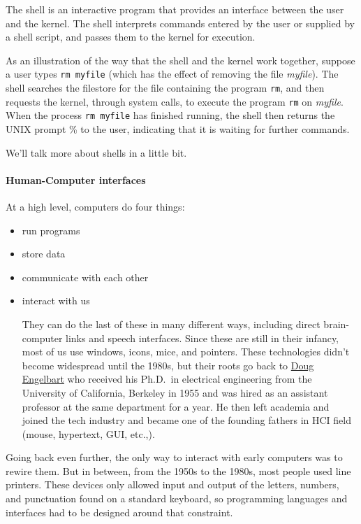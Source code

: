 \documentclass[
]{book}
\begin{document}
The shell is an interactive program that provides an interface between the user and the kernel. The shell interprets commands entered by the user or supplied by a shell script, and passes them to the kernel for execution.

As an illustration of the way that the shell and the kernel work together, suppose a user types \texttt{rm\ myfile} (which has the effect of removing the file \emph{myfile}). The shell searches the filestore for the file containing the program \texttt{rm}, and then requests the kernel, through system calls, to execute the program \texttt{rm} on \emph{myfile}. When the process \texttt{rm\ myfile} has finished running, the shell then returns the UNIX prompt \% to the user, indicating that it is waiting for further commands.

We'll talk more about shells in a little bit.

\hypertarget{human-computer-interfaces}{%
\paragraph{Human-Computer interfaces}\label{human-computer-interfaces}}

At a high level, computers do four things:

\begin{itemize}
\item
  run programs
\item
  store data
\item
  communicate with each other
\item
  interact with us

  They can do the last of these in many different ways, including direct brain-computer links and speech interfaces. Since these are still in their infancy, most of us use windows, icons, mice, and pointers. These technologies didn't become widespread until the 1980s, but their roots go back to \href{https://en.wikipedia.org/wiki/Douglas_Engelbart}{Doug Engelbart} who received his Ph.D.~in electrical engineering from the University of California, Berkeley in 1955 and was hired as an assistant professor at the same department for a year. He then left academia and joined the tech industry and became one of the founding fathers in HCI field (mouse, hypertext, GUI, etc.,).
\end{itemize}

Going back even further, the only way to interact with early computers was to rewire them. But in between, from the 1950s to the 1980s, most people used line printers. These devices only allowed input and output of the letters, numbers, and punctuation found on a standard keyboard, so programming languages and interfaces had to be designed around that constraint.
\end{document}
